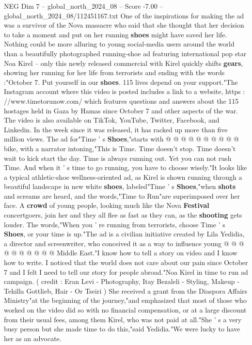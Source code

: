 \begin{textsample}{NEG Dim 7 – global\_north\_2024\_08 – Score -7.00 – global\_north\_2024\_08/112451167.txt}  \label{ex:f7_neg_088}
One of the inspirations for making the ad was a survivor of the Nova massacre who said that she thought that her decision to take a moment and put on her running \textbf{shoes} might have saved her life.
Nothing could be more alluring to young social-media users around the world than a beautifully photographed running-shoe ad featuring international pop star Noa Kirel -- only this newly released commercial with Kirel quickly shifts \textbf{gears}, showing her running for her life from terrorists and ending with the words :"October 7.
Put yourself in our \textbf{shoes}. 115 lives depend on your support."The Instagram account where this video is posted includes a link to a website, https : //www.timetorunow.com/ which features questions and answers about the 115 hostages held in Gaza by Hamas since October 7 and other aspects of the war.
The video is also available on TikTok, YouTube, Twitter, Facebook, and Linkedin.
In the week since it was released, it has racked up more than five million views.
The ad for"Time ' s \textbf{Shoes},"starts with @ @ @ @ @ @ @ @ @ @ bike, with a narrator intoning,"This is Time.
Time doesn't stop.
Time doesn't wait to kick start the day.
Time is always running out.
Yet you can not rush Time.
And when it ' s time to go running, you have to choose wisely."It looks like a typical athletic-shoe wellness-oriented ad, as Kirel is shown running through a beautiful landscape in new white \textbf{shoes}, labeled"Time ' s \textbf{Shoes},"when \textbf{shots} and screams are heard, and the words,"Time to Run"are superimposed over her face.
A \textbf{crowd} of young people, looking much like the Nova \textbf{Festival} concertgoers, join her and they all flee as fast as they can, as the \textbf{shooting} gets louder.
The words,"When you ' re running from terrorists, choose Time ' s \textbf{Shoes}, or your time is up."The ad is a civilian initiative created by Lila Yedidia, a director and screenwriter, who conceived it as a way to influence young @ @ @ @ @ @ @ @ @ @ Middle East."I know how to tell a story on video and I know how to write.
I noticed that the world does not care about our pain since October 7 and I felt I need to tell our story for people abroad."Noa Kirel in time to run ad campaign. ( credit : Eran Levi - Photography, Itay Bezaleli - Styling, Makeup - Tehilla Gottlieb, Hair - Or Tseiri ) She received a grant from the Diaspora Affairs Ministry"at the beginning of the journey,"and emphasized that most of those who worked on the video did so with no financial compensation, or at a large discount from their usual fees, among them Kirel, who was not paid at all."She ' s a very busy person but she made time to do this,"said Yedidia."We were lucky to have her as an advocate.

\end{textsample}
